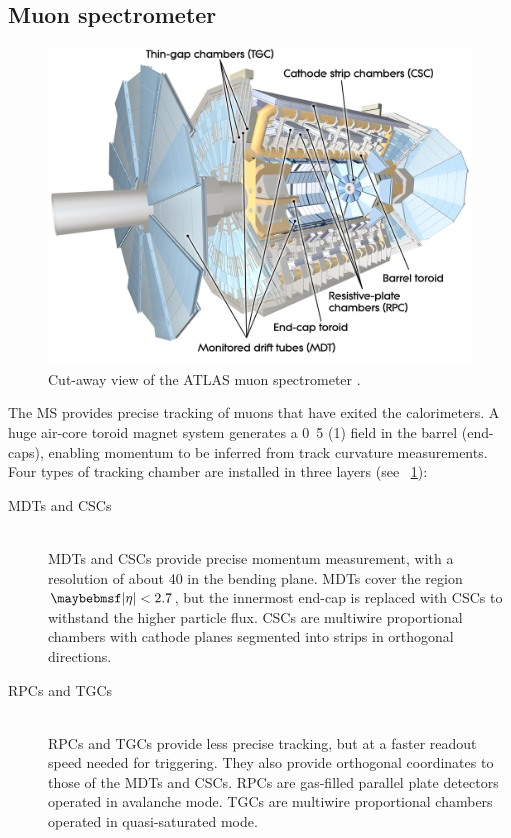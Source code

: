 \subsection{Muon spectrometer}
\label{sec:atlas:ms}

\begin{figure}
	\includegraphics[width=\mediumfigwidth]{tex/experiment/ms_whole}
	\caption{Cut-away view of the ATLAS muon spectrometer \cite{ATLAS-detector}.}
	\label{fig:muon_spectrometer}
\end{figure}

The \ac{MS} provides precise tracking of muons that have exited the calorimeters. A huge 
air-core toroid magnet system generates a \unit{0.5}{\tesla} (\unit{1}{\tesla}) field in 
the barrel (end-caps), enabling momentum to be inferred from track curvature measurements.
Four types of tracking chamber are installed in three layers (see 
\Figure~\ref{fig:muon_spectrometer}):
\begin{description}
\item[\acp{MDT} and \acp{CSC}] \hfill \\
	\acp{MDT} and \acp{CSC} provide precise momentum measurement, with a resolution of 
	about \unit{40}{\micro\metre} in the bending plane. \acp{MDT} cover the region 
	$\mods{\eta} < 2.7$, but the innermost end-cap is replaced with \acp{CSC} to 
	withstand the higher particle flux. \acp{CSC} are multiwire proportional chambers 
	with cathode planes segmented into strips in orthogonal directions.
\item[\acp{RPC} and \acp{TGC}] \hfill \\
	\acp{RPC} and \acp{TGC} provide less precise tracking, but at a faster readout speed 
	needed for triggering. They also provide orthogonal coordinates to those of	the 
	\acp{MDT} and \acp{CSC}. 
	\acp{RPC} are gas-filled parallel plate detectors operated in avalanche mode.
	\acp{TGC} are multiwire proportional chambers operated in quasi-saturated mode.
\end{description}



